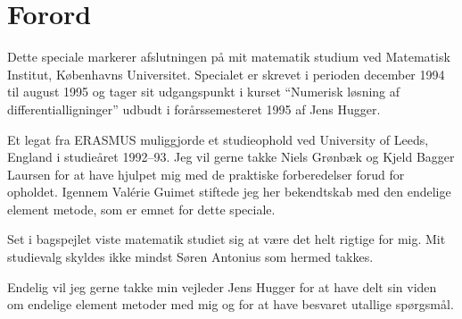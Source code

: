\chapter*{Forord}

Dette speciale markerer afslutningen på mit matematik studium ved
Matematisk Institut, Københavns Universitet. Specialet er skrevet i
perioden december 1994 til august 1995 og tager sit udgangspunkt i
kurset ``Numerisk løsning af differentialligninger'' udbudt i
forårssemesteret 1995 af Jens Hugger. 

Et legat fra ERASMUS muliggjorde et studieophold ved University of
Leeds, England i studieåret 1992--93. Jeg vil gerne takke Niels
Grønbæk og Kjeld Bagger Laursen for at have hjulpet mig med de
praktiske forberedelser forud for opholdet. Igennem Val\'{e}rie Guimet
stiftede jeg her bekendtskab med den endelige element metode, som er
emnet for dette speciale.

Set i bagspejlet viste matematik studiet sig at være det helt rigtige
for mig. Mit studievalg skyldes ikke mindst Søren Antonius som hermed
takkes.

Endelig vil jeg gerne takke min vejleder Jens Hugger for at have delt sin
viden om endelige element metoder med mig og for at have besvaret
utallige spørgsmål. 

